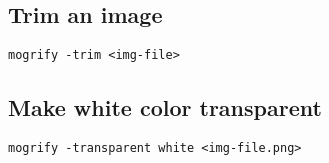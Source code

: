 \subsection{Trim an image}
\begin{verbatim}
mogrify -trim <img-file> 
\end{verbatim}
\subsection{Make white color transparent}
\begin{verbatim}
mogrify -transparent white <img-file.png> 
\end{verbatim}
